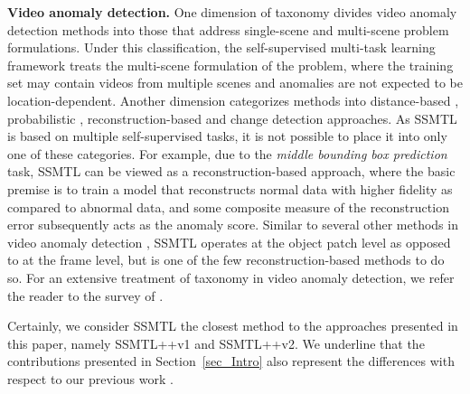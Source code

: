 \documentclass[times,twocolumn,final,authoryear]{elsarticle}
\begin{document}
\noindent
\textbf{Video anomaly detection.}
One dimension of taxonomy divides video anomaly detection methods into those that address single-scene and multi-scene problem formulations. Under this classification, the self-supervised multi-task learning framework treats the multi-scene formulation of the problem, where the training set may contain videos from multiple scenes and anomalies are not expected to be location-dependent. Another dimension categorizes methods into distance-based \citep{Ionescu-CVPR-2019,Ramachandra-WACV-2020b,Ramachandra-MVA-2021,Ravanbakhsh-WACV-2018,Saligrama-CVPR-2012,Smeureanu-ICIAP-2017,Tran-BMVC-2017,Xu-BMVC-2015}, probabilistic \citep{Antic-ICCV-2011,Cheng-CVPR-2015,Feng-NC-2017,Hinami-ICCV-2017,Kim-CVPR-2009,Mehran-CVPR-2009,Wu-CVPR-2010}, reconstruction-based \citep{Astrid-BMVC-2021,Gong-ICCV-2019,Hasan-CVPR-2016,Huang-TNNLS-2022,Huang-TII-2022,Huang-TC-2022,Luo-ICCV-2017,Luo-PAMI-2022,Nguyen-ICCV-2019,Park-CVPR-2020,Ravanbakhsh-ICIP-2017,Ristea-CVPR-2022,Vu-AAAI-2019} and change detection \citep{Giorno-ECCV-2016,Ionescu-ICCV-2017,Liu-BMVC-2018} approaches. As SSMTL is based on multiple self-supervised tasks, it is not possible to place it into only one of these categories. For example, due to the \textit{middle bounding box prediction} task, SSMTL can be viewed as a reconstruction-based approach, where the basic premise is to train a model that reconstructs normal data with higher fidelity as compared to abnormal data, and some composite measure of the reconstruction error subsequently acts as the anomaly score. Similar to several other methods in video anomaly detection \citep{Cheng-CVPR-2015,Feng-NC-2017,Hinami-ICCV-2017,Ionescu-CVPR-2019,Ramachandra-MVA-2021,Vu-AAAI-2019}, SSMTL operates at the object patch level as opposed to at the frame level, but is one of the few reconstruction-based methods to do so. For an extensive treatment of taxonomy in video anomaly detection, we refer the reader to the survey of \cite{Ramachandra-PAMI-2020}. 

Certainly, we consider SSMTL \citep{Georgescu-CVPR-2021} the closest method to the approaches presented in this paper, namely SSMTL++v1 and SSMTL++v2. We underline that the contributions presented in Section~\ref{sec_Intro} also represent the differences with respect to our previous work \citep{Georgescu-CVPR-2021}.
\end{document}
